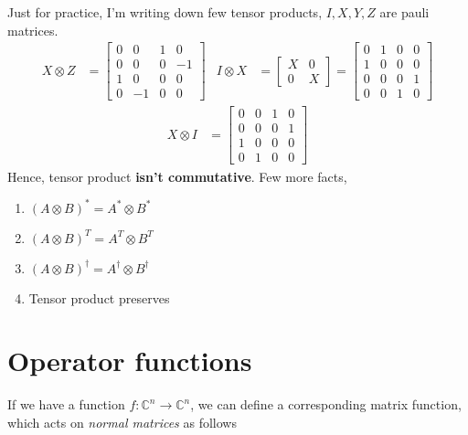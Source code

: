 Just for practice, I'm writing down few tensor products, $I,X,Y,Z$ are pauli matrices.
\begin{align}
    X \otimes Z &= 
    \begin{bmatrix}
        0 & 0 & 1 & 0 \\
        0 & 0 & 0 & -1 \\
        1 & 0 & 0 & 0 \\
        0 & -1 & 0 & 0
    \end{bmatrix} &
    I \otimes X &=
    \begin{bmatrix}
        X & 0 \\ 0 & X
    \end{bmatrix}
    = 
    \begin{bmatrix}
        0 & 1 & 0 & 0 \\
        1 & 0 & 0 & 0 \\
        0 & 0 & 0 & 1 \\
        0 & 0 & 1 & 0
    \end{bmatrix}
\end{align}
\begin{align}
    X \otimes I &=
    \begin{bmatrix}
        0 & 0 & 1 & 0 \\
        0 & 0 & 0 & 1 \\
        1 & 0 & 0 & 0 \\
        0 & 1 & 0 & 0
    \end{bmatrix}
\end{align}
Hence, tensor product \textbf{isn't commutative}.
Few more facts,
\begin{enumerate}
    \item $(A \otimes B)^* = A^* \otimes B^*$
    \item $(A \otimes B)^T = A^T \otimes B^T$
    \item $(A \otimes B)^\dag = A^\dagger \otimes B^\dagger$
    \item Tensor product preserves 
\end{enumerate}

\section{Operator functions}
If we have a function $f : \mathbb{C}^n \rightarrow \mathbb{C}^n$, we can define a corresponding matrix function, which acts on \textit{normal matrices} as follows

